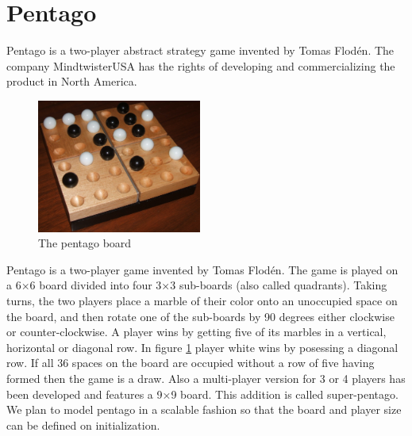 \section{Pentago}
\label{Pentago}
Pentago is a two-player abstract strategy game invented by Tomas Flodén. 
The company MindtwisterUSA \cite{MindTwisterUSA} has the rights of developing and commercializing the product in North America. %


\begin{figure}
  \begin{center}
    \includegraphics[width=0.48\textwidth]{Images/Pentago-Game-Winning-Position.jpg}
  \end{center}
  \caption{The pentago board}
  \label{fig:boardpic}
\end{figure}

\vspace{6pt}

Pentago is a two-player game invented by Tomas Flodén. 
The game is played on a 6×6 board divided into four 3×3 sub-boards (also called quadrants). 
Taking turns, the two players place a marble of their color onto an unoccupied space on the board, and then rotate one of the sub-boards by 90 degrees either clockwise or counter-clockwise. 
A player wins by getting five of its marbles in a vertical, horizontal or diagonal row. 
In figure \ref{fig:boardpic} player white wins by posessing a diagonal row. 
If all 36 spaces on the board are occupied without a row of five having formed then the game is a draw. 
Also a multi-player version for 3 or 4 players has been developed and features a 9×9 board. 
This addition is called super-pentago. 
We plan to model pentago in a scalable fashion so that the board and player size can be defined on initialization.
